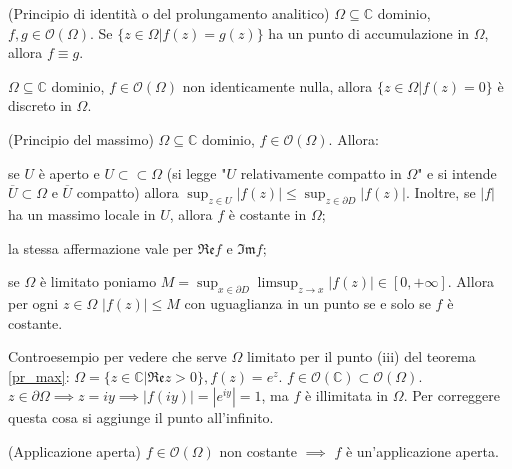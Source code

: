 \begin{thm}
  (Principio di identità o del prolungamento analitico) $\Omega \subseteq \mathbb{C}$ dominio, $f, g \in \mathcal{O}(\Omega)$. Se $\{z \in \Omega | f(z)=g(z)\}$ ha un punto di accumulazione in $\Omega$, allora $f \equiv g$.
\end{thm}

\begin{cor} \label{olo_discr}
  $\Omega \subseteq \mathbb{C}$ dominio, $f \in \mathcal{O}(\Omega)$ non identicamente nulla, allora $\{z \in \Omega | f(z)=0\}$ è discreto in $\Omega$.
\end{cor}

\begin{thm} \label{pr_max}
  (Principio del massimo) $\Omega \subseteq \mathbb{C}$ dominio, $f \in \mathcal{O}(\Omega)$. Allora:
  \begin{nlist}
    \item se $U$ è aperto e $U \subset \subset \Omega$ (si legge "$U$ relativamente compatto in $\Omega$" e si intende $\overline{U} \subset \Omega$ e $\overline{U}$ compatto) allora $\displaystyle \sup_{z \in U} |f(z)| \le \sup_{z \in \partial D} |f(z)|$. Inoltre, se $|f|$ ha un massimo locale in $U$, allora $f$ è costante in $\Omega$;
    \item la stessa affermazione vale per $\mathfrak{Re} f$ e $\mathfrak{Im} f$;
    \item se $\Omega$ è limitato poniamo $\displaystyle M=\sup_{x \in \partial D} \limsup_{z \longrightarrow x} |f(z)| \in [0, +\infty]$. Allora per ogni $z \in \Omega$ $|f(z)| \le M$ con uguaglianza in un punto se e solo se $f$ è costante.
  \end{nlist}
\end{thm}

\begin{ex}
  Controesempio per vedere che serve $\Omega$ limitato per il punto (iii) del teorema \ref{pr_max}: $\Omega=\{z \in \mathbb{C} | \mathfrak{Re} z>0\}, f(z)=e^z$. $f \in \mathcal{O}(\mathbb{C}) \subset \mathcal{O}(\Omega)$.
  $z \in \partial\Omega \implies z=iy \implies |f(iy)|=|e^{iy}|=1$, ma $f$ è illimitata in $\Omega$. Per correggere questa cosa si aggiunge il punto all'infinito.
\end{ex}

\begin{thm}
  (Applicazione aperta) $f \in \mathcal{O}(\Omega)$ non costante $\implies$ $f$ è un'applicazione aperta.
\end{thm}

